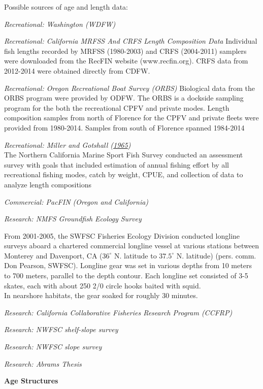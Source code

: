 \documentclass[12pt,]{article}
\begin{document}
Possible sources of age and length data:

\emph{Recreational: Washington (WDFW)}

\emph{Recreational: California MRFSS And CRFS Length Composition Data}
Individual fish lengths recorded by MRFSS (1980-2003) and CRFS
(2004-2011) samplers were downloaded from the RecFIN website
(www.recfin.org). CRFS data from 2012-2014 were obtained directly from
CDFW.

\emph{Recreational: Oregon Recreational Boat Survey (ORBS)} Biological
data from the ORBS program were provided by ODFW. The ORBS is a dockside
sampling program for the both the recreational CPFV and private modes.
Length composition samples from north of Florence for the CPFV and
private fleets were provided from 1980-2014. Samples from south of
Florence spanned 1984-2014

\emph{Recreational: Miller and Gotshall
(\protect\hyperlink{ref-Miller1965}{1965})}\\
The Northern California Marine Sport Fish Survey conducted an assessment
survey with goals that included estimation of annual fishing effort by
all recreational fishing modes, catch by weight, CPUE, and collection of
data to analyze length compositions

\emph{Commercial: PacFIN (Oregon and California)}

\emph{Research: NMFS Groundfish Ecology Survey}

From 2001-2005, the SWFSC Fisheries Ecology Division conducted longline
surveys aboard a chartered commercial longline vessel at various
stations between Monterey and Davenport, CA (\(36^\circ\) N. latitude to
\(37.5^\circ\) N. latitude) (pers. comm. Don Pearson, SWFSC). Longline
gear was set in various depths from 10 meters to 700 meters, parallel to
the depth contour. Each longline set consisted of 3-5 skates, each with
about 250 2/0 circle hooks baited with squid.\\
In nearshore habitats, the gear soaked for roughly 30 minutes.

\emph{Research: California Collaborative Fisheries Research Program
(CCFRP)}

\emph{Research: NWFSC shelf-slope survey}

\emph{Research: NWFSC slope survey}

\emph{Research: Abrams Thesis}

\vspace{.5cm}

\textbf{Age Structures}
\end{document}
